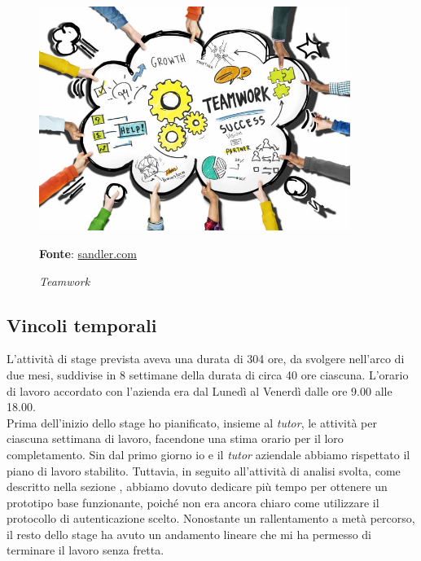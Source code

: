         \begin{figure}[h]
            \centering
            \includegraphics[width=0.9\textwidth]{immagini/team.jpg}
            \caption{\textit{Teamwork}}
            \textbf{Fonte}:
            \href{https://www.sandler.com/blog/6-benefits-of-teamwork-in-the-workplace/}{sandler.com}
            \label{fig: Teamwork}
        \end{figure}
\newpage
    \subsection{Vincoli temporali}\label{sec:vincoli_tempo}
    L'attività di stage prevista aveva una durata di 304 ore, da svolgere nell'arco di due mesi, suddivise in 8 settimane della durata di circa 40 ore ciascuna. L'orario di lavoro accordato con l'azienda era dal Lunedì al Venerdì dalle ore 9.00 alle 18.00. \\
    Prima dell'inizio dello stage ho pianificato, insieme al \textit{tutor}, le attività per ciascuna settimana di lavoro, facendone una stima orario per il loro completamento. Sin dal primo giorno io e il \textit{tutor} aziendale abbiamo rispettato il piano di lavoro stabilito. Tuttavia, in seguito all'attività di analisi svolta, come descritto nella sezione , abbiamo dovuto dedicare più tempo per ottenere un prototipo base funzionante, poiché non era ancora chiaro come utilizzare il protocollo di autenticazione scelto. Nonostante un rallentamento a metà percorso, il resto dello stage ha avuto un andamento lineare che mi ha permesso di terminare il lavoro senza fretta. 
    
